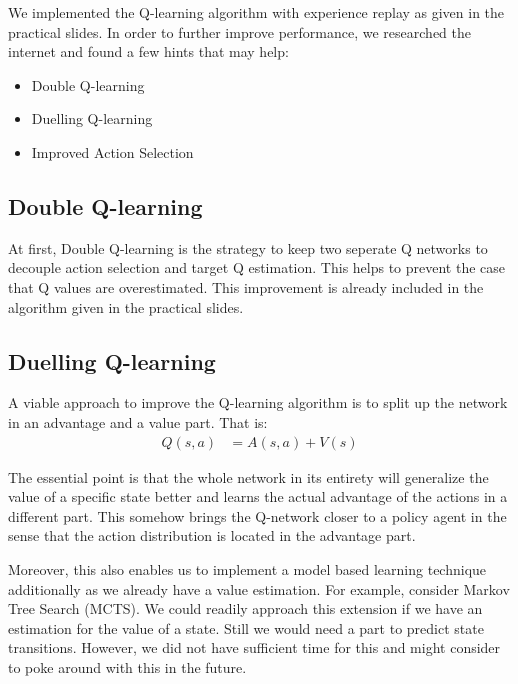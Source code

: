 We implemented the Q-learning algorithm with experience replay as given in the practical slides. In order to further improve performance, we researched the internet and found a few hints that may help:
\begin{itemize}
  \item Double Q-learning
  \item Duelling Q-learning
  \item Improved Action Selection
\end{itemize}

\subsection{Double Q-learning}
At first, Double Q-learning is the strategy to keep two seperate Q networks to decouple action selection and target Q estimation. This helps to prevent the case that Q values are overestimated. This improvement is already included in the algorithm given in the practical slides.

\subsection{Duelling Q-learning}
A viable approach to improve the Q-learning algorithm is to split up the network in an advantage and a value part. That is:
\begin{align*}
  Q(s, a) &= A(s, a) + V(s)
\end{align*}

The essential point is that the whole network in its entirety will generalize the value of a specific state better and learns the actual advantage of the actions in a different part. This somehow brings the Q-network closer to a policy agent in the sense that the action distribution is located in the advantage part.

Moreover, this also enables us to implement a model based learning technique additionally as we already have a value estimation. For example, consider Markov Tree Search (MCTS). We could readily approach this extension if we have an estimation for the value of a state. Still we would need a part to predict state transitions. However, we did not have sufficient time for this and might consider to poke around with this in the future.

